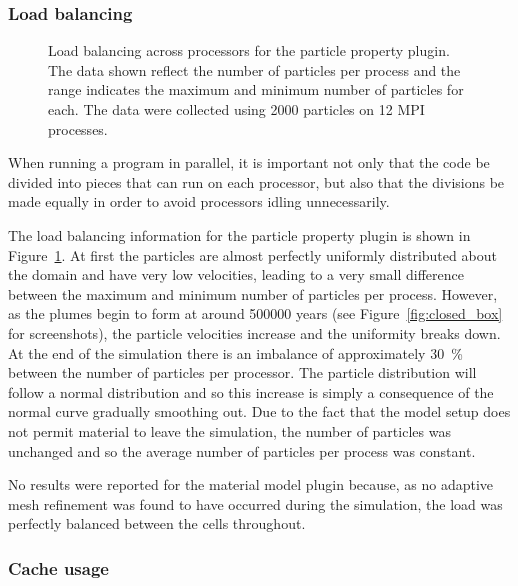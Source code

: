 \subsubsection{Load balancing}

\begin{figure}
    \centering
    
    \caption{
        Load balancing across processors for the particle property plugin.
        The data shown reflect the number of particles per process and the range indicates the maximum and minimum number of particles for each.
        The data were collected using 2000 particles on 12 MPI processes.
    }
    \label{fig:load_balancing_particle_property}
\end{figure}

When running a program in parallel, it is important not only that the code be divided into pieces that can run on each processor, but also that the divisions be made equally in order to avoid processors idling unnecessarily.

The load balancing information for the particle property plugin is shown in Figure~\ref{fig:load_balancing_particle_property}.
At first the particles are almost perfectly uniformly distributed about the domain and have very low velocities, leading to a very small difference between the maximum and minimum number of particles per process.
However, as the plumes begin to form at around \num{500000} years (see Figure~\ref{fig:closed_box} for screenshots), the particle velocities increase and the uniformity breaks down.
At the end of the simulation there is an imbalance of approximately \SI{30}{\percent} between the number of particles per processor.
The particle distribution will follow a normal distribution and so this increase is simply a consequence of the normal curve gradually smoothing out.
Due to the fact that the model setup does not permit material to leave the simulation, the number of particles was unchanged and so the average number of particles per process was constant.

No results were reported for the material model plugin because, as no adaptive mesh refinement was found to have occurred during the simulation, the load was perfectly balanced between the cells throughout.

\subsubsection{Cache usage}

